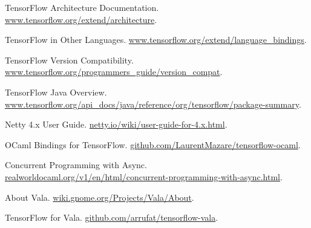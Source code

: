\documentclass[letterpaper,twocolumn,10pt]{article}
\begin{document}
\begin{thebibliography}{9}
        \raggedright
        TensorFlow Architecture Documentation. \url{www.tensorflow.org/extend/architecture}.

        TensorFlow in Other Languages. \url{www.tensorflow.org/extend/language_bindings}.

        TensorFlow Version Compatibility. \url{www.tensorflow.org/programmers_guide/version_compat}.

        TensorFlow Java Overview. \url{www.tensorflow.org/api_docs/java/reference/org/tensorflow/package-summary}.

        Netty 4.x User Guide. \url{netty.io/wiki/user-guide-for-4.x.html}.

        OCaml Bindings for TensorFlow. \url{github.com/LaurentMazare/tensorflow-ocaml}.

        Concurrent Programming with Async. \url{realworldocaml.org/v1/en/html/concurrent-programming-with-async.html}.

        About Vala. \url{wiki.gnome.org/Projects/Vala/About}.

        TensorFlow for Vala. \url{github.com/arrufat/tensorflow-vala}.
\end{thebibliography}
\end{document}
